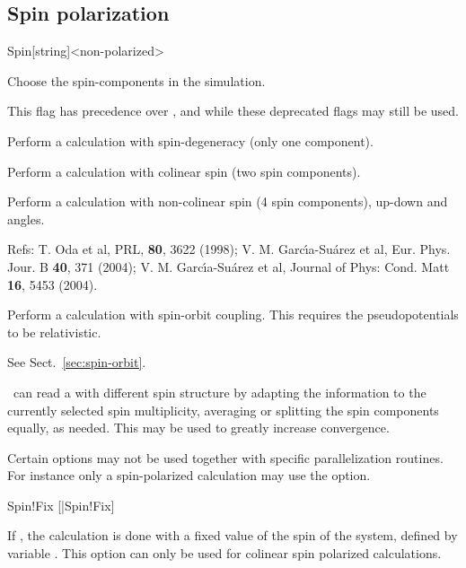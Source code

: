 \subsection{Spin polarization}


\begin{fdfentry}{Spin}[string]<non-polarized>

  Choose the spin-components in the simulation.

  \note This flag has precedence over ,  and
   while these deprecated flags may still be used.
  \begin{fdfoptions}

    Perform a calculation with spin-degeneracy (only one component).

    \option[polarized]%
    Perform a calculation with colinear spin (two spin components).

    Perform a calculation with non-colinear spin (4 spin components),
    up-down and angles.

    Refs: T. Oda et al, PRL, \textbf{80}, 3622 (1998); 
    V. M. Garc\'{\i}a-Su\'arez et al, Eur. Phys. Jour. B \textbf{40}, 371 (2004);
    V. M. Garc\'{\i}a-Su\'arez et al, Journal of
    Phys: Cond. Matt \textbf{16}, 5453 (2004).

    Perform a calculation with spin-orbit coupling.  This requires the
    pseudopotentials to be relativistic.

    See Sect.~\ref{sec:spin-orbit}.

  \end{fdfoptions}

  \siesta\ can read a  with different spin structure by
  adapting the information to the currently selected spin
  multiplicity, averaging or splitting the spin components equally, as
  needed. This may be used to greatly increase convergence.

  Certain options may not be used together with specific
  parallelization routines.  For instance only a spin-polarized
  calculation may use the  option.

\end{fdfentry}

\begin{fdflogicalF}{Spin!Fix}
  [|Spin!Fix]

  If \fdftrue, the calculation is done with a fixed value of the spin
  of the system, defined by variable . This option can
  only be used for colinear spin polarized calculations.

\end{fdflogicalF}

